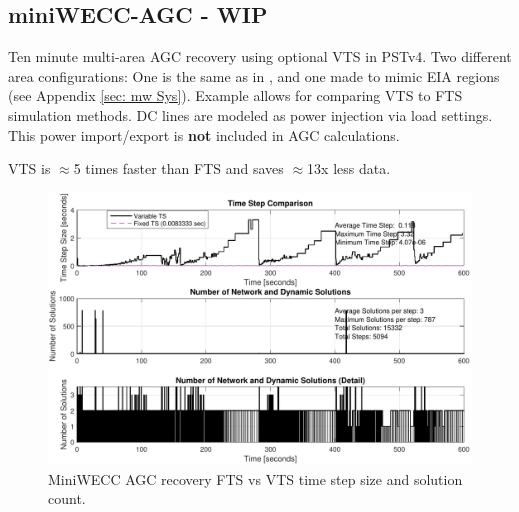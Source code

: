 \subsection{miniWECC-AGC - WIP} 
Ten minute multi-area AGC recovery using optional VTS in PSTv4.
Two different area configurations: One is the same as in \cite{haines2020}, and one made to mimic EIA regions (see Appendix \ref{sec: mw Sys}).
Example allows for comparing VTS to FTS simulation methods.
DC lines are modeled as power injection via load settings.
This power import/export is \textbf{not} included in AGC calculations.




\noindent VTS is $\approx$5 times faster than FTS and saves $\approx$13x less data.

\begin{figure}[H]
	\centering
	\footnotesize
	\includegraphics[width=\linewidth]{examples/miniWECC/maAGC-1}
	\caption{MiniWECC AGC recovery FTS vs VTS time step size and solution count.}
	\label{fig: mwAGC steps}
\end{figure}%


